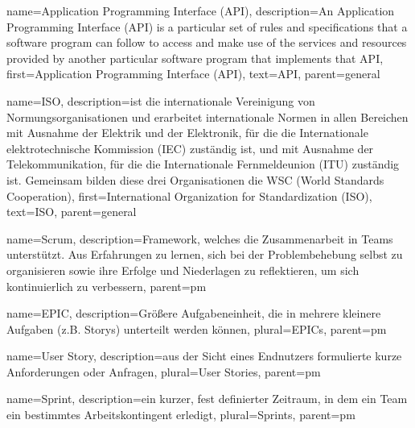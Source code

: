 

{
    name={Application Programming Interface (API)},
    description={An Application Programming Interface (API) is a particular set of rules and specifications that a software program can follow to access and make use of the services and resources provided by another particular software program that implements that API},
    first={Application Programming Interface (API)},
    text={API},
    parent=general
}

{
   name={ISO},                                %
   description={ist die internationale Vereinigung von Normungsorganisationen und erarbeitet internationale Normen in allen Bereichen mit Ausnahme der Elektrik und der Elektronik, für die die Internationale elektrotechnische Kommission (IEC) zuständig ist, und mit Ausnahme der Telekommunikation, für die die Internationale Fernmeldeunion (ITU) zuständig ist. Gemeinsam bilden diese drei Organisationen die WSC (World Standards Cooperation)},                      %
   first={International Organization for Standardization (ISO)},
   text={ISO},
   parent=general
} 


{
        name=Scrum,
        description={Framework, welches die Zusammenarbeit in Teams unterstützt. Aus Erfahrungen zu lernen, sich bei der Problembehebung selbst zu organisieren sowie ihre Erfolge und Niederlagen zu reflektieren, um sich kontinuierlich zu verbessern},
        parent=pm
}

{
        name=EPIC,
        description={Größere Aufgabeneinheit, die in mehrere kleinere Aufgaben (z.B. Storys) unterteilt werden können},
        plural={EPICs},
        parent=pm
}

{
        name=User Story,
        description={aus der Sicht eines Endnutzers formulierte kurze Anforderungen oder Anfragen},
        plural={User Stories},
        parent=pm
}

{
        name=Sprint,
        description={ein kurzer, fest definierter Zeitraum, in dem ein Team ein bestimmtes Arbeitskontingent erledigt},
        plural={Sprints},
        parent=pm
}

